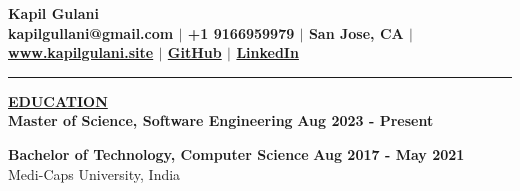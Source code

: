 \documentclass{article}
\begin{document}
\begin{center}
\thispagestyle{empty}
\large \textbf{Kapil Gulani \\}
\normalsize \textbf{kapilgullani@gmail.com $\mid$ +1 9166959979 $\mid$ San Jose, CA  $\mid$ \href{https://kapilgulani.site/}{www.kapilgulani.site} $\mid$ \href{https://github.com/kapilgulani}{GitHub} $\mid$ \href{https://www.linkedin.com/in/kapil-gulani}{LinkedIn} \\}
\rule{\textwidth}{1pt}
\end{center}







\noindent \textbf{\underline{EDUCATION}} \\
\textbf{ Master of Science, Software Engineering } \hfill \textbf{Aug 2023 - Present} \\
\begin{itemize}[noitemsep,nolistsep,leftmargin=*]
\end{itemize}
\begin{itemize}
\end{itemize}
\textbf{Bachelor of Technology, Computer Science} \hfill \hfill \textbf{Aug 2017 - May 2021} \\
Medi-Caps University, India \\

% 
%
\end{document}
